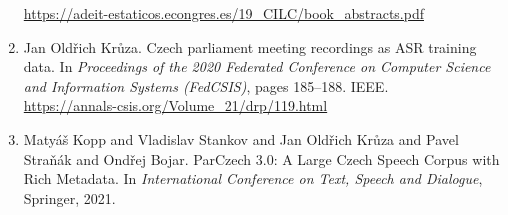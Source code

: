 \documentclass[hidelinks,12pt,a4paper]{report}
\let\openright=\clearpage
\begin{document}
\begin{enumerate}
{  \url{https://adeit-estaticos.econgres.es/19\_CILC/book\_abstracts.pdf}
}
\item{
  Jan Oldřich Krůza.
  Czech parliament meeting recordings as ASR training data.
  In \textit{Proceedings of the 2020 Federated Conference on Computer Science
  and Information Systems (FedCSIS)},
  pages 185--188.
  IEEE.\\
  \url{https://annals-csis.org/Volume\_21/drp/119.html}
}
\item{
  Matyáš Kopp and Vladislav Stankov and Jan Oldřich Krůza and Pavel Straňák and Ondřej Bojar.
  ParCzech 3.0: A Large Czech Speech Corpus with Rich Metadata.
  In \textit{International Conference on Text, Speech and Dialogue},
  Springer, 2021.
}
\end{enumerate}



\openright
\end{document}
